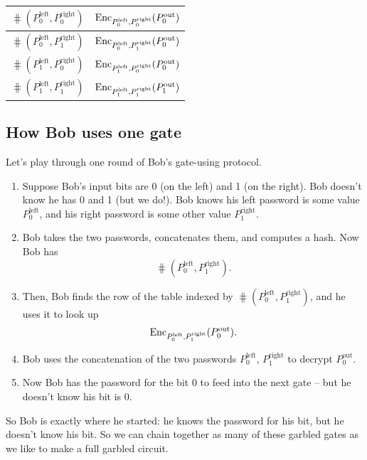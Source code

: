 \begin{center}
\begin{tabular}{|c|c|}
\hline
  $\hash(P_{0}^{\text{left}},P_{0}^{\text{right}})$ &
  $\operatorname{Enc}_{P_{0}^{\text{left}},P_{0}^{\text{right}}}( P_{0}^{\text{out}})$ \\
  \hline
  $\hash(P_{0}^{\text{left}},P_{1}^{\text{right}})$ &
  $\operatorname{Enc}_{P_{0}^{\text{left}},P_{1}^{\text{right}}}( P_{0}^{\text{out}})$ \\
  \hline
  $\hash(P_{1}^{\text{left}},P_{0}^{\text{right}})$ &
  $\operatorname{Enc}_{P_{1}^{\text{left}},P_{0}^{\text{right}}}( P_{0}^{\text{out}})$ \\
  \hline
  $\hash(P_{1}^{\text{left}},P_{1}^{\text{right}})$ &
  $\operatorname{Enc}_{P_{1}^{\text{left}},P_{1}^{\text{right}}}( P_{1}^{\text{out}} )$ \\
  \hline
  \end{tabular}
\end{center}


\subsection{How Bob uses one gate}

Let's play through one round of Bob's gate-using protocol.

\begin{enumerate}
\item
  Suppose Bob's input bits are 0 (on the left) and 1 (on the right). Bob
  doesn't know he has 0 and 1 (but we do!). Bob knows his left password
  is some value $P_{0}^{\text{left}}$, and his right password is some
  other value $P_{1}^{\text{right}}$.
\item
  Bob takes the two passwords, concatenates them, and computes a hash.
  Now Bob has
  \[\hash(P_{0}^{\text{left}},P_{1}^{\text{right}}).\]
\item
  Then, Bob finds the row of the table indexed by
  $\hash(P_{0}^{\text{left}},P_{1}^{\text{right}})$, and
  he uses it to look up
  \[\operatorname{Enc}_{P_{0}^{\text{left}},P_{1}^{\text{right}}}( P_{0}^{\text{out}}).\]
\item
  Bob uses the concatenation of the two passwords
  $P_{0}^{\text{left}}$, $P_{1}^{\text{right}}$ to decrypt
  $P_{0}^{\text{out}}.$
\item
  Now Bob has the password for the bit 0 to feed into the next gate --
  but he doesn't know his bit is 0.
\end{enumerate}

So Bob is exactly where he started: he knows the password for his bit,
but he doesn't know his bit. So we can chain together as many of these
garbled gates as we like to make a full garbled circuit.

